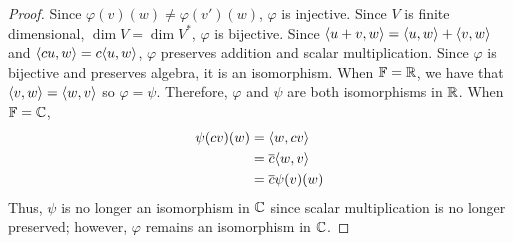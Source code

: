 \begin{proof}
    Since $\varphi(v)(w) \neq \varphi(v')(w)$, $\varphi$ is injective. 
    Since $V$ is finite dimensional, $\dim V = \dim V^*$,
    $\varphi$ is bijective.
    Since $\langle u+v, w \rangle =\langle u, w \rangle + \langle v, w \rangle$ and
    $\langle c u, w \rangle = c \langle u, w \rangle$,
    $\varphi$ preserves addition and scalar multiplication.
    Since $\varphi$ is bijective and preserves algebra,
    it is an isomorphism.
    When $\mathbb{F} = \mathbb{R}$, we have that $\langle v, w \rangle = \langle w, v \rangle$
    so $\varphi = \psi$.
    Therefore, $\varphi$ and $\psi$ are both isomorphisms in $\mathbb{R}$.
    When $\mathbb{F} = \mathbb{C}$, 
    \begin{align*}
        \psi(c v)(w)
        &= \langle w, c v \rangle\\
        &= \overline{c} \langle w, v \rangle\\
        &= \overline{c} \psi(v)(w)
    \end{align*}
    Thus, $\psi$ is no longer an isomorphism in $\mathbb{C}$
    since scalar multiplication is no longer preserved; however,
    $\varphi$ remains an isomorphism in $\mathbb{C}$.
    
    
\end{proof}